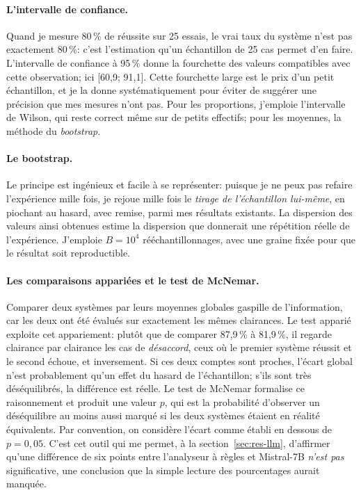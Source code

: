 \documentclass[11pt,a4paper]{article}
\begin{document}
\paragraph{L'intervalle de confiance.} Quand je mesure 80\,\% de réussite sur 25 essais, le vrai taux du système n'est pas exactement 80\,\%: c'est l'estimation qu'un échantillon de 25 cas permet d'en faire. L'intervalle de confiance à 95\,\% donne la fourchette des valeurs compatibles avec cette observation; ici [60,9; 91,1]. Cette fourchette large est le prix d'un petit échantillon, et je la donne systématiquement pour éviter de suggérer une précision que mes mesures n'ont pas. Pour les proportions, j'emploie l'intervalle de Wilson, qui reste correct même sur de petits effectifs; pour les moyennes, la méthode du \emph{bootstrap}.

\paragraph{Le bootstrap.} Le principe est ingénieux et facile à se représenter: puisque je ne peux pas refaire l'expérience mille fois, je rejoue mille fois le \emph{tirage de l'échantillon lui-même}, en piochant au hasard, avec remise, parmi mes résultats existants. La dispersion des valeurs ainsi obtenues estime la dispersion que donnerait une répétition réelle de l'expérience. J'emploie $B = 10^4$ rééchantillonnages, avec une graine fixée pour que le résultat soit reproductible.

\paragraph{Les comparaisons appariées et le test de McNemar.} Comparer deux systèmes par leurs moyennes globales gaspille de l'information, car les deux ont été évalués sur exactement les mêmes clairances. Le test apparié exploite cet appariement: plutôt que de comparer 87,9\,\% à 81,9\,\%, il regarde clairance par clairance les cas de \emph{désaccord}, ceux où le premier système réussit et le second échoue, et inversement. Si ces deux comptes sont proches, l'écart global n'est probablement qu'un effet du hasard de l'échantillon; s'ils sont très déséquilibrés, la différence est réelle. Le test de McNemar formalise ce raisonnement et produit une valeur $p$, qui est la probabilité d'observer un déséquilibre au moins aussi marqué si les deux systèmes étaient en réalité équivalents. Par convention, on considère l'écart comme établi en dessous de $p = 0{,}05$. C'est cet outil qui me permet, à la section~\ref{sec:res-llm}, d'affirmer qu'une différence de six points entre l'analyseur à règles et Mistral-7B \emph{n'est pas} significative, une conclusion que la simple lecture des pourcentages aurait manquée. 
\end{document}
